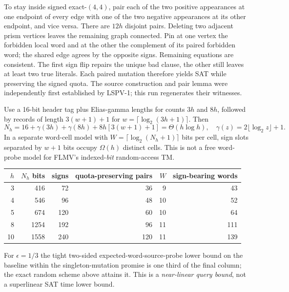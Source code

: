 \documentclass[11pt]{article}
\begin{document}
To stay inside signed exact-$(4,4)$, pair each of the two positive appearances at one endpoint of every edge with one of the two negative appearances at its other endpoint, and vice versa. There are $12h$ disjoint pairs. Deleting two adjacent prism vertices leaves the remaining graph connected. Pin at one vertex the forbidden local word and at the other the complement of its paired forbidden word; the shared edge agrees by the opposite signs. Remaining equations are consistent. The first sign flip repairs the unique bad clause, the other still leaves at least two true literals. Each paired mutation therefore yields SAT while preserving the signed quota. The source construction and pair lemma were independently first established by LSPV-1; this run regenerates their witnesses.

Use a 16-bit header tag plus Elias-gamma lengths for counts $3h$ and $8h$, followed by records of length $3(w+1)+1$ for $w=\lceil\log_2(3h+1)\rceil$. Then
\[
N_h=16+\gamma(3h)+\gamma(8h)+8h[3(w+1)+1]=\Theta(h\log h),
\quad\gamma(z)=2\lfloor\log_2z\rfloor+1.
\]
In a separate word-cell model with $W=\lceil\log_2(N_h+1)\rceil$ bits per cell, sign slots separated by $w+1$ bits occupy $\Omega(h)$ distinct cells. This is not a free word-probe model for FLMV's indexed-\emph{bit} random-access TM.

\begin{center}\small
\begin{tabular}{rrrrrr}
\toprule
$h$&$N_h$ bits&signs&quota-preserving pairs&$W$&sign-bearing words\\\midrule
3&416&72&36&9&43\\
4&546&96&48&10&52\\
5&674&120&60&10&64\\
8&1254&192&96&11&111\\
10&1558&240&120&11&139\\
\bottomrule
\end{tabular}
\end{center}
For $\epsilon=1/3$ the tight two-sided expected-word-source-probe lower bound on the baseline within the singleton-mutation promise is one third of the final column; the exact random scheme above attains it. This is a \emph{near-linear query bound}, not a superlinear SAT time lower bound.
\end{document}
